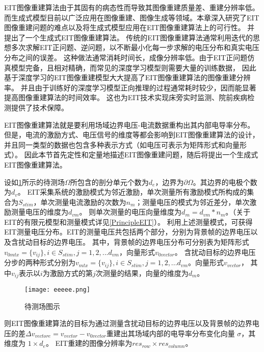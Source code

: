 
EIT图像重建算法由于其固有的病态性而导致其图像重建质量差、重建分辨率低。而生成式模型目前以广泛应用在图像重建、图像生成等领域。本章深入研究了EIT图像重建问题的难点以及将生成式模型应用在EIT图像重建算法上的可行性。
并提出了一个生成式EIT图像重建算法。
传统的EIT图像重建算法通常利用迭代的思想多次求解EIT正问题、逆问题，以不断最小化每一步求解的电压分布和真实电压分布之间的误差。
这种做法通常消耗时间长，成像分辨率低。由于EIT正问题仿真模型完备，且相对精确，而常见的深度学习模型则需要大量的训练数据，
因此基于深度学习的EIT图像重建模型大大提高了EIT图像重建算法的图像重建分辨率。
并且由于训练好的深度学习模型正向推理的过程通常耗时较少，因而能显著提高图像重建算法的时间效率。
这也为EIT技术实现床旁实时监测、院前疾病检测提供了技术保障。

EIT图像重建算法就是要利用场域边界电压-电流数据重构出其内部电导率分布。
但是，电流的激励方式、电压信号的维度等都会影响到EIT图像重建算法的设计，并且同一类型的数据也包含多种表示方式（如电压可表示为矩阵形式和向量形式）。
因此本节首先定性和定量地描述EIT图像重建问题，随后将提出一个生成式EIT图像重建算法。

设如\cref{figure:xyz}所示的待测场$\Omega$所包含的剖分单元个数为$d_e$，边界为$\partial \Omega$。其边界的电极个数为$d_v$。
EIT采集系统的激励模式为邻近激励，单次测量所有激励模式所构成的集合为$S_{stim}$，单次测量电流激励的次数为$n_m$；测量电压的模式为邻近差分，单次激励测量电压的维度为$d_{vm}$。
则单次测量的电压向量维度为$d_m = d_{vm} * n_m$。（关于EIT的有限元模型和测量模式详见\cref{PrincipleEIT}）。
利用上述测量模式，可获得EIT测量电压分布。EIT的测量电压共包括两个部分，分别为背景帧的边界电压以及含扰动目标的边界电压。
其中，背景帧的边界电压分布可分别表为矩阵形式$v_{0mtx} = \{v_{ij}\}, i \in S_{stim}, j =1,2,...d_{vm}$，向量形式$v_{0vector}$。
含扰动目标的边界电压分步的两种形式分别为$v_{mtx} = \{v_{ij}\}, i \in S_{stim}, j =1,2,...d_{vm}$。向量形式$v_{vector}$，
其中$v_{ij}$表示以$i$为激励方式的第$j$次测量的结果，向量的维度为$d_m$。

\begin{figure}[h]
    \centering
    \texttt{[image: eeeee.png]}
    \caption{待测场图示}
    \label{figure:xyz}
  \end{figure}


则EIT图像重建算法的目标为通过测量含扰动目标的边界电压以及背景帧的边界电压的差$\Delta v_{vectore} = v_{vector} - v_{0vector}$重建出其场域内部的电导率分布变化向量 $\sigma$，其维度为 $1 \times d_e$。
EIT重建的图像分辨率为$res_{row} \times res_{column}$。


